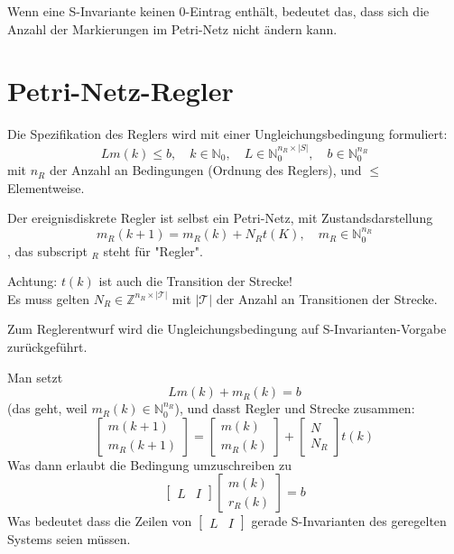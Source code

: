 Wenn eine S-Invariante keinen 0-Eintrag enthält, bedeutet das, dass sich die
Anzahl der Markierungen im Petri-Netz nicht ändern kann.

\section{Petri-Netz-Regler}


Die Spezifikation des Reglers wird mit einer Ungleichungsbedingung
formuliert:
\begin{equation}
    L m(k) \leq b, \quad k\in\mathbb{N}_0, \quad L\in\mathbb{N}_0^{n_R\times |S|}, \quad  b\in\mathbb{N}_0^{n_R}
\end{equation}
mit $n_R$ der Anzahl an Bedingungen (Ordnung des Reglers),
und $\leq$ Elementweise.

Der ereignisdiskrete Regler ist selbst ein Petri-Netz,
mit Zustandsdarstellung
\begin{equation}
    m_R(k+1) = m_R(k)+N_Rt(K), \quad m_R \in \mathbb{N}_0^{n_R}
\end{equation}
, das subscript $_R$ steht für "Regler".

Achtung: $t(k)$ ist auch die Transition der Strecke!\\
Es muss gelten $N_R \in \mathbb{Z}^{n_R \times |\mathcal{T}|}$
mit $|\mathcal{T}|$ der Anzahl an Transitionen der Strecke.

Zum Reglerentwurf wird die Ungleichungsbedingung auf S-Invarianten-Vorgabe
zurückgeführt.

Man setzt
\begin{equation}
    Lm(k) + m_R(k) = b
\end{equation}
(das geht, weil $m_R(k) \in \mathbb{N}_0^{n_R}$),
und dasst Regler und Strecke zusammen:
\begin{equation}
    \begin{bmatrix}
        m(k+1)\\m_R(k+1)
    \end{bmatrix}
    =
    \begin{bmatrix}
        m(k)\\m_R(k)
    \end{bmatrix}
    +
    \begin{bmatrix}
       N\\N_R 
    \end{bmatrix}
    t(k)
\end{equation}
Was dann erlaubt die Bedingung umzuschreiben zu
\begin{equation}
    \begin{bmatrix}
        L&I
    \end{bmatrix}
    \begin{bmatrix}
        m(k)\\r_R(k)
    \end{bmatrix}
    =b
\end{equation}
Was bedeutet dass die Zeilen von $\begin{bmatrix}
    L&I
\end{bmatrix}$ gerade S-Invarianten des geregelten Systems seien müssen.

